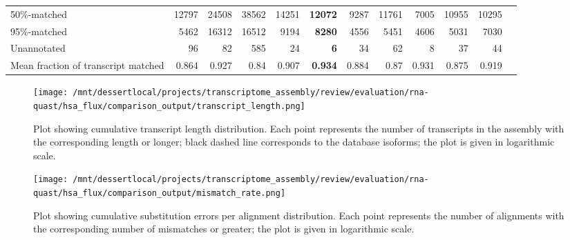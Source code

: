 \documentclass[12pt,a4paper]{article}
\begin{document}
\begin{table}[t]
\begin{adjustbox}{width=1\textwidth}
\begin{tabular}{|l*{11}{|r}|}
50\%-matched                                            & 12797                  & 24508                  & 38562                  & 14251                  & \textbf{12072}         & 9287                   & 11761                  & 7005                   & 10955                  & 10295                  \\
95\%-matched                                            & 5462                   & 16312                  & 16512                  & 9194                   & \textbf{8280}          & 4556                   & 5451                   & 4606                   & 5031                   & 7030                   \\
Unannotated                                             & 96                     & 82                     & 585                    & 24                     & \textbf{6}             & 34                     & 62                     & 8                      & 37                     & 44                     \\
Mean fraction of transcript matched                     & 0.864                  & 0.927                  & 0.84                   & 0.907                  & \textbf{0.934}         & 0.884                  & 0.87                   & 0.931                  & 0.875                  & 0.919                  \\ \hline
\end{tabular}
\end{adjustbox}
\end{table}

\FloatBarrier
\clearpage
{}

\begin{figure}[t]
\centering
\texttt{[image: /mnt/dessertlocal/projects/transcriptome\_assembly/review/evaluation/rna-quast/hsa\_flux/comparison\_output/transcript\_length.png]}
\caption{Plot showing cumulative transcript length distribution. Each point represents the number of transcripts in the assembly with the corresponding length or longer; black dashed line corresponds to the database isoforms; the plot is given in logarithmic scale.}
\end{figure}
\FloatBarrier
\clearpage


\begin{figure}[t]
\centering
\texttt{[image: /mnt/dessertlocal/projects/transcriptome\_assembly/review/evaluation/rna-quast/hsa\_flux/comparison\_output/mismatch\_rate.png]}
\caption{Plot showing cumulative substitution errors per alignment distribution. Each point represents the number of alignments with the corresponding number of mismatches or greater; the plot is given in logarithmic scale.}
\end{figure}
\FloatBarrier
\clearpage
\end{document}
